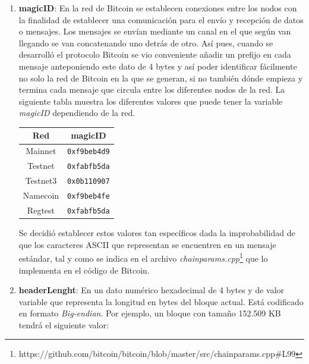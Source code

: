 \documentclass{article}
\begin{document}
    \begin{enumerate}
        \item \textbf{magicID}: En la red de Bitcoin se establecen conexiones entre los nodos con la finalidad de establecer una comunicación para el envío y recepción de datos o mensajes. Los mensajes se envían mediante un canal en el que según van llegando se van concatenando uno detrás de otro. Así pues, cuando se desarrolló el protocolo Bitcoin se vio conveniente añadir un prefijo en cada mensaje anteponiendo este dato de 4 bytes y así poder identificar fácilmente no solo la red de Bitcoin en la que se generan, si no también dónde empieza y termina cada mensaje que circula entre los diferentes nodos de la red. La siguiente tabla muestra los diferentes valores que puede tener la variable \textit{magicID} dependiendo de la red.
        
        \begin{table}[H]
        \centering
        \begin{tabular}{| c | c |} 
            \hline
            Red & magicID \\
            \hline
            Mainnet & \texttt{0xf9beb4d9} \\
            \hline
            Testnet & \texttt{0xfabfb5da} \\
            \hline
            Testnet3 & \texttt{0x0b110907} \\
            \hline
            Namecoin & \texttt{0xf9beb4fe} \\
            \hline
            Regtest & \texttt{0xfabfb5da} \\
            \hline
        \end{tabular}
        \label{table:1}
        \end{table}
        
        Se decidió establecer estos valores tan específicos dada la improbabilidad de que los caracteres ASCII que representan se encuentren en un mensaje estándar, tal y como se indica en el archivo \textit{chainparams.cpp}\footnote{https://github.com/bitcoin/bitcoin/blob/master/src/chainparams.cpp\#L99} que lo implementa en el código de Bitcoin.
    
        \item \textbf{headerLenght}: En un dato numérico hexadecimal de 4 bytes y de valor variable que representa la longitud en bytes del bloque actual. Está codificado en formato \textit{Big-endian}. Por ejemplo, un bloque con tamaño 152.509 KB tendrá el siguiente valor:
        

\end{enumerate}
\end{document}
